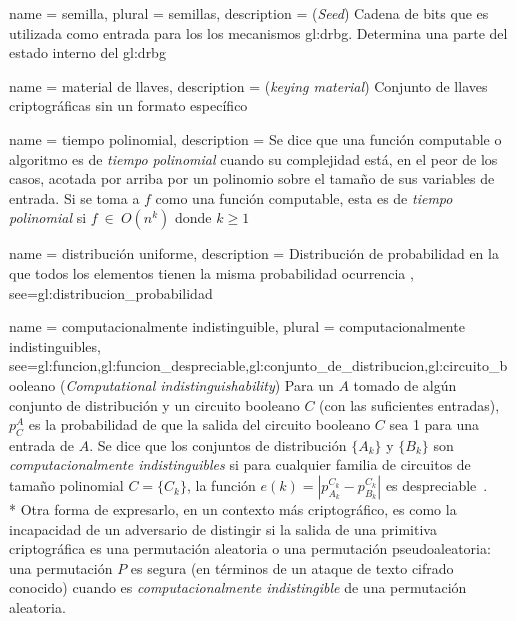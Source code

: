 {
  name = semilla,
  plural = semillas,
  description = {
    (\textit{Seed}) Cadena de bits que es utilizada como entrada para los
    los mecanismos \gls{gl:drbg}. Determina una parte del estado interno
    del \gls{gl:drbg}%
  }
}

{
  name = material de llaves,
  description = {(\textit{keying material})
    Conjunto de llaves criptográficas sin un formato específico%
  }
}

{
  name = tiempo polinomial,
  description = {
    Se dice que una función computable o algoritmo es de \textit{tiempo
    polinomial} cuando su complejidad está, en el peor de los casos, acotada
    por arriba por un polinomio sobre el tamaño de sus variables de entrada.
    Si se toma a $f$ como una función computable, esta es de \textit{tiempo
    polinomial} si $f\: \in\: O(n^k)$ donde $k \ge 1$%
  }
}

{
  name = distribución uniforme,
  description = {
    Distribución de probabilidad en la que todos los elementos tienen la misma
    probabilidad ocurrencia%
  },
  see={gl:distribucion_probabilidad}
}

{
  name = computacionalmente indistinguible,
  plural = computacionalmente indistinguibles,
  see={gl:funcion,gl:funcion_despreciable,gl:conjunto_de_distribucion,gl:circuito_booleano}
}
{%
  (\textit{Computational indistinguishability}) Para un $ A $ tomado de
  algún conjunto de distribución y un circuito booleano $ C $ (con las
  suficientes entradas), $ p_C^A $ es la probabilidad de que la salida
  del circuito booleano $ C $ sea 1 para una entrada de $ A $. Se dice
  que los conjuntos de distribución $ \{ A_k \} $ y $ \{ B_k \} $ son
  \textit{computacionalmente indistinguibles} si para cualquier familia
  de circuitos de tamaño polinomial $ C = \{ C_k \} $, la función
  $ e(k) = | p_{A_k}^{C_k} - p_{B_k}^{C_k} |$ es
  despreciable~\cite{DBLP:conf/stoc/BeaverMR90}.
  \\*
  Otra forma de expresarlo, en un contexto más criptográfico, es como la
  incapacidad de un adversario de distingir si la salida de una primitiva
  criptográfica es una permutación aleatoria o una permutación pseudoaleatoria:
  una permutación $ P $ es segura (en términos de un ataque de texto cifrado
  conocido) cuando es \textit{computacionalmente indistingible} de una
  permutación aleatoria.%
}

